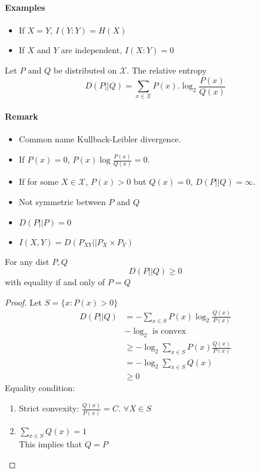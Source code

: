 \paragraph{Examples}
\begin{itemize}
\item If $X=Y$, $I(Y:Y)=H(X)$
\item If $X$ and $Y$ are independent, $I(X:Y)=0$
\end{itemize}


\begin{defi}
Let $P$ and $Q$ be distributed on $\mathcal{X}$.
The relative entropy
\begin{equation*}
D(P||Q)=\sum_{x\in \mathcal{X}} P(x). \log_2 \frac{P(x)}{Q(x)}
\end{equation*}
\end{defi}

\paragraph{Remark}
\begin{itemize}
\item Common name Kullback-Leibler divergence.
\item If $P(x)=0$, $P(x)\log \frac{P(x)}{Q(x)}=0$.
\item If for some $X\in\mathcal{X}$, $P(x)>0$ but $Q(x)=0$, $D(P||Q)=\infty$.
\item Not symmetric between $P$ and $Q$
\item $D(P||P)=0$
\item $I(X,Y)=D(P_{XY}||P_X\times P_Y)$
\end{itemize}

\begin{prop}
For any dist $P,Q$
\begin{equation*}
D(P||Q)\geq 0
\end{equation*}
with equality if and only of $P=Q$
\end{prop}

\begin{proof}
Let $S=\{x:P(x)>0\}$
\begin{align*}
D(P||Q) & = - \sum_{x\in S} P(x) \log_2 \frac{Q(x)}{P(x)}\\
& -\log_2 \text{ is convex}\\
\tag{1}
& \geq -\log_2 \sum_{x\in S} P(x) \frac{Q(x)}{P(x)}\\
& = -\log_2 \sum_{x\in S} Q(x)\\
\tag{2} 
& \geq 0
\end{align*}
Equality condition:
\begin{enumerate}
\item Strict convexity: $\frac{Q(x)}{P(x)}=C$. $\forall X \in S$
\item $\sum_{x\in S} Q(x)=1$\\
This implies that $Q=P$
\end{enumerate}
\end{proof}

